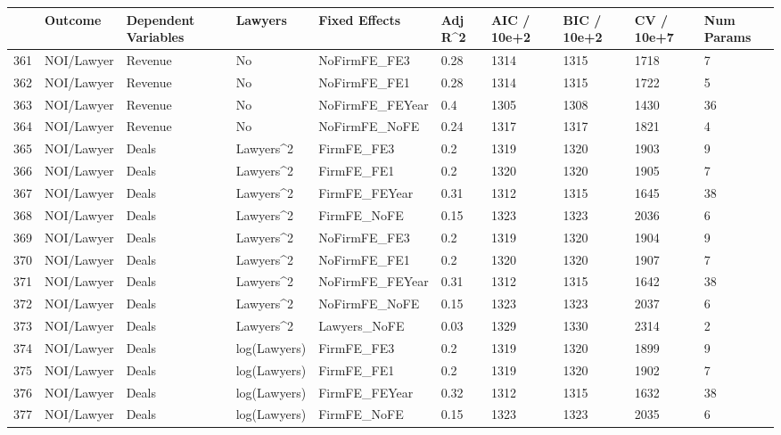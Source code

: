 \documentclass{article}
\begin{document}
\begin{table}[H]
\centering
\begin{tabular}{rlllllllll}
  \hline
 & Outcome & Dependent Variables & Lawyers & Fixed Effects & Adj R^2 & AIC / 10e+2 & BIC / 10e+2 & CV / 10e+7 & Num Params \\ 
  \hline
361 & NOI/Lawyer & Revenue & No & NoFirmFE\_FE3 & 0.28 & 1314 & 1315 & 1718 & 7 \\ 
  362 & NOI/Lawyer & Revenue & No & NoFirmFE\_FE1 & 0.28 & 1314 & 1315 & 1722 & 5 \\ 
  363 & NOI/Lawyer & Revenue & No & NoFirmFE\_FEYear & 0.4 & 1305 & 1308 & 1430 & 36 \\ 
  364 & NOI/Lawyer & Revenue & No & NoFirmFE\_NoFE & 0.24 & 1317 & 1317 & 1821 & 4 \\ 
  365 & NOI/Lawyer & Deals & Lawyers^2 & FirmFE\_FE3 & 0.2 & 1319 & 1320 & 1903 & 9 \\ 
  366 & NOI/Lawyer & Deals & Lawyers^2 & FirmFE\_FE1 & 0.2 & 1320 & 1320 & 1905 & 7 \\ 
  367 & NOI/Lawyer & Deals & Lawyers^2 & FirmFE\_FEYear & 0.31 & 1312 & 1315 & 1645 & 38 \\ 
  368 & NOI/Lawyer & Deals & Lawyers^2 & FirmFE\_NoFE & 0.15 & 1323 & 1323 & 2036 & 6 \\ 
  369 & NOI/Lawyer & Deals & Lawyers^2 & NoFirmFE\_FE3 & 0.2 & 1319 & 1320 & 1904 & 9 \\ 
  370 & NOI/Lawyer & Deals & Lawyers^2 & NoFirmFE\_FE1 & 0.2 & 1320 & 1320 & 1907 & 7 \\ 
  371 & NOI/Lawyer & Deals & Lawyers^2 & NoFirmFE\_FEYear & 0.31 & 1312 & 1315 & 1642 & 38 \\ 
  372 & NOI/Lawyer & Deals & Lawyers^2 & NoFirmFE\_NoFE & 0.15 & 1323 & 1323 & 2037 & 6 \\ 
  373 & NOI/Lawyer & Deals & Lawyers^2 & Lawyers\_NoFE & 0.03 & 1329 & 1330 & 2314 & 2 \\ 
  374 & NOI/Lawyer & Deals & log(Lawyers) & FirmFE\_FE3 & 0.2 & 1319 & 1320 & 1899 & 9 \\ 
  375 & NOI/Lawyer & Deals & log(Lawyers) & FirmFE\_FE1 & 0.2 & 1319 & 1320 & 1902 & 7 \\ 
  376 & NOI/Lawyer & Deals & log(Lawyers) & FirmFE\_FEYear & 0.32 & 1312 & 1315 & 1632 & 38 \\ 
  377 & NOI/Lawyer & Deals & log(Lawyers) & FirmFE\_NoFE & 0.15 & 1323 & 1323 & 2035 & 6 \\ 

\end{tabular}
\end{table}
\end{document}

